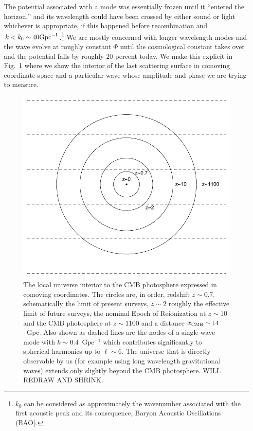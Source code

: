 \documentclass[psfig,11pt]{article}
\begin{document}
The potential associated with a mode was essentially frozen until it ``entered the horizon,'' and its wavelength could have been crossed by either sound or light whichever is appropriate, if this happened before recombination and $k<k_0\sim40{\rm Gpc}^{-1}$.\footnote{$k_0$ can be considered as approximately the wavenumber associated with the first acoustic peak and its consequence, Baryon Acoustic Oscillations (BAO).}  We are mostly concerned with longer wavelength modes and the wave evolve at roughly constant $\Phi$ until the cosmological constant takes over and the potential falls by roughly 20 percent today. We make this explicit in Fig.~1 where we show the interior of the last scattering surface in comoving coordinate space and a particular wave whose amplitude and phase we are trying to measure.
\begin{figure}[t]
\centering
\includegraphics{nsffig.pdf}
\caption{The local universe interior to the CMB photosphere expressed in comoving coordinates. The circles are, in order, redshift $z\sim0.7$, schematically the limit of present surveys, $z\sim2$ roughly the effective limit of future surveys, the nominal Epoch of Reionization at $z\sim10$ and the CMB photosphere at $z\sim1100$ and a distance $x_{\rm CMB}\sim14$~Gpc. Also shown as dashed lines are the nodes of a single wave mode with $k\sim0.4$~Gpc$^{-1}$ which contributes significantly to spherical harmonics up to $\ell\sim6$. The universe that is directly observable by us (for example using long wavelength gravitational waves) extends only slightly beyond the CMB photosphere. WILL REDRAW AND SHRINK.}
\end{figure}
\end{document}
